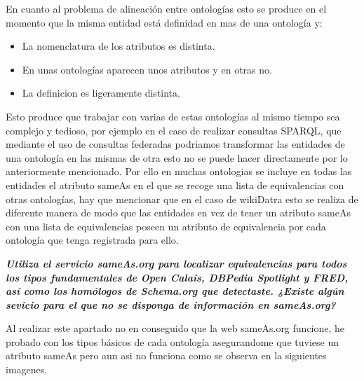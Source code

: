 \documentclass[spanish]{llncs}   %
\begin{document}
En cuanto al problema de alineación entre ontologías esto se produce en el momento que la misma entidad está definidad en mas de una ontología y:
\begin{itemize}
    \item La nomenclatura de los atributos es distinta.
    \item En unas ontologías aparecen unos atributos y en otras no.
    \item La definicion es ligeramente distinta.
\end{itemize}
Esto produce que trabajar con varias de estas ontologías al mismo tiempo sea complejo y tedioso, por ejemplo en el caso de realizar consultas SPARQL, 
que mediante el uso de consultas federadas podriamos transformar las entidades de una ontología en las mismas de otra esto no se puede hacer directamente 
por lo anteriormente mencionado. Por ello en muchas ontologias se incluye en todas las entidades el atributo sameAs en el que se recoge una lista de equivalencias 
con otras ontologías, hay que mencionar que en el caso de wikiDatra esto se realiza de diferente manera de modo que las entidades en vez de tener un 
atributo sameAs con una lista de equivalencias poseen un atributo de equivalencia por cada ontología que tenga registrada para ello.

\textbf{\textit{Utiliza el servicio sameAs.org para localizar equivalencias para todos los tipos fundamentales de Open Calais, DBPedia 
Spotlight y FRED, así como los homólogos de Schema.org que detectaste. ¿Existe algún sevicio para el que no se disponga de información 
en sameAs.org?}}

Al realizar este apartado no en conseguido que la web sameAs.org funcione, he probado con los tipos básicos de cada ontología asegurandome que tuviese un
atributo sameAs pero aun asi no funciona como se observa en la siguientes imagenes.
\end{document}
